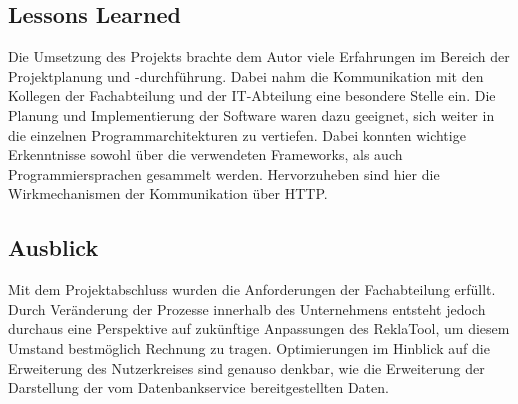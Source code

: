 \subsection{Lessons Learned}
\label{sec:LessonsLearned}
Die Umsetzung des Projekts brachte dem Autor viele Erfahrungen im Bereich der Projektplanung und -durchführung.
Dabei nahm die Kommunikation mit den Kollegen der Fachabteilung und der IT-Abteilung eine besondere Stelle ein.
Die Planung und Implementierung der Software waren dazu geeignet, sich weiter in die einzelnen Programmarchitekturen zu vertiefen.
Dabei konnten wichtige Erkenntnisse sowohl über die verwendeten Frameworks, als auch Programmiersprachen gesammelt werden.
Hervorzuheben sind hier die Wirkmechanismen der Kommunikation über \acs{HTTP}.

\subsection{Ausblick}
\label{sec:Ausblick}
Mit dem Projektabschluss wurden die Anforderungen der Fachabteilung erfüllt.
Durch Veränderung der Prozesse innerhalb des Unternehmens entsteht jedoch durchaus
eine Perspektive auf zukünftige Anpassungen des ReklaTool, um diesem Umstand bestmöglich
Rechnung zu tragen. Optimierungen im Hinblick auf die Erweiterung des Nutzerkreises
sind genauso denkbar, wie die Erweiterung der Darstellung der vom Datenbankservice bereitgestellten Daten.